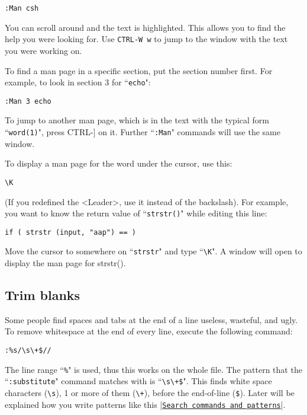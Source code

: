 \begin{Verbatim}[samepage=true]
 :Man csh
\end{Verbatim}

You can scroll around and the text is highlighted.
This allows you to find the help you were looking for.
Use \texttt{CTRL-W w} to jump to the window with the text you were working on.

To find a man page in a specific section, put the section number first.
For example, to look in section 3 for ``\texttt{echo}":

\begin{Verbatim}[samepage=true]
 :Man 3 echo
\end{Verbatim}

To jump to another man page, which is in the text with the typical form ``\texttt{word(1)}", press CTRL-] on it.
Further ``\texttt{:Man}" commands will use the same window.

To display a man page for the word under the cursor, use this:

\begin{Verbatim}[samepage=true]
 \K
\end{Verbatim}

(If you redefined the <Leader>, use it instead of the backslash).
For example, you want to know the return value of ``\texttt{strstr()}" while editing
this line:

\begin{Verbatim}[samepage=true]
    if ( strstr (input, "aap") == )
\end{Verbatim}

Move the cursor to somewhere on ``\texttt{strstr}" and type ``\texttt{\textbackslash{}K}".
A window will open to display the man page for strstr().
\subsection{Trim blanks}
Some people find spaces and tabs at the end of a line useless, wasteful, and ugly.
To remove whitespace at the end of every line, execute the following command:

\begin{Verbatim}[samepage=true]
 :%s/\s\+$//
\end{Verbatim}

The line range ``\texttt{\%}" is used, thus this works on the whole file.
The pattern that the ``\texttt{:substitute}" command matches with is ``\texttt{\textbackslash{}s\textbackslash{}+\$}".
This finds white space characters (\texttt{\textbackslash{}s}), 1 or more of them (\texttt{\textbackslash{}+}), before the end-of-line (\texttt{\$}).
Later will be explained how you write patterns like this |\hyperref[Search commands and patterns]{\texttt{Search commands and patterns}}|.

